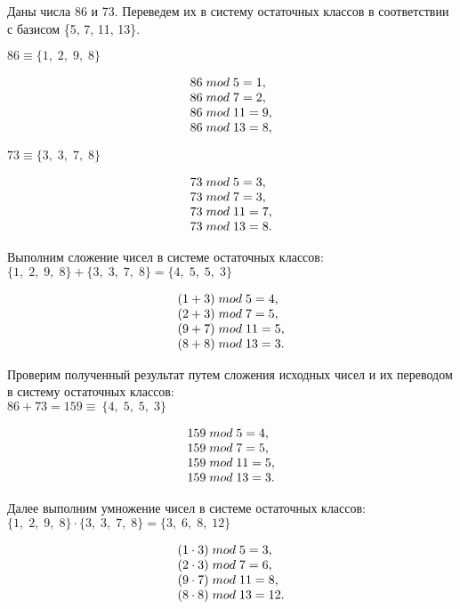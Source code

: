 \documentclass[a4paper,14pt]{extarticle}
\begin{document}
	Даны числа 86 и 73. Переведем их в систему остаточных классов в соответствии с базисом \{5, 7, 11, 13\}.
	
	$86 \equiv \{1,\;2,\;9,\;8\}$
	
	\[
	\begin{array}[c]{l}
		86\;mod\;5 = 1,\\
		86\;mod\;7 = 2,\\
		86\;mod\;11 = 9,\\
		86\;mod\;13 = 8,\\
	\end{array}
	\]
	
	$73 \equiv \{3,\;3,\;7,\;8\}$
	
	\[
	\begin{array}[c]{l}
		73\;mod\;5 = 3,\\
		73\;mod\;7 = 3,\\
		73\;mod\;11 = 7,\\
		73\;mod\;13 = 8.\\
	\end{array}
	\]
	
	Выполним сложение чисел в системе остаточных классов:\\
	$\{1,\;2,\;9,\;8\}+\{3,\;3,\;7,\;8\}=\{4,\;5,\;5,\;3\}$
	
	\[
	\begin{array}[c]{l}
		(1+3)\;mod\;5 = 4,\\
		(2+3)\;mod\;7 = 5,\\
		(9+7)\;mod\;11 = 5,\\
		(8+8)\;mod\;13 = 3.
	\end{array}
	\]
	
	Проверим полученный результат путем сложения исходных чисел и их переводом в систему остаточных классов:\\
	$86+73=159 \equiv\ \{4,\;5,\;5,\;3\}$
	
	\[
	\begin{array}[c]{l}
		159\;mod\;5 = 4,\\
		159\;mod\;7 = 5,\\
		159\;mod\;11 = 5,\\
		159\;mod\;13 = 3.\\
	\end{array}
	\]
	
	\pagebreak
	
	Далее выполним умножение чисел в системе остаточных классов:\\
	$\{1,\;2,\;9,\;8\} \cdot \{3,\;3,\;7,\;8\}=\{3,\;6,\;8,\;12\}$
	
	\[
	\begin{array}[c]{l}
		(1\cdot3)\;mod\;5 = 3,\\
		(2\cdot3)\;mod\;7 = 6,\\
		(9\cdot7)\;mod\;11 = 8,\\
		(8\cdot8)\;mod\;13 = 12.
	\end{array}
	\]
	
\end{document}
